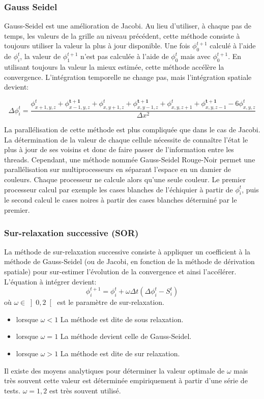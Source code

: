 \subsubsection{Gauss Seidel}
Gauss-Seidel est une amélioration de Jacobi. 
Au lieu d'utiliser, à chaque pas de temps, les valeurs de la grille au niveau précédent, cette méthode consiste à toujours utiliser la valeur la plus à jour disponible. 
Une fois $\phi^{t+1}_0$ calculé à l'aide de $\phi^{t}_i$, la valeur de $\phi^{t+1}_1$ n'est pas calculée à l'aide de $\phi^{t}_0$ mais avec $\phi^{t+1}_0$. 
En utilisant toujours la valeur la mieux estimée, cette méthode accélère la convergence. 
L'intégration temporelle ne change pas, mais l'intégration spatiale devient: 

\[ \Delta \phi_i^t = \dfrac{\phi_{x+1,y,z}^t  + \phi_{x-1,y,z}^\mathbf{t+1} + \phi_{x,y+1,z}^t  + \phi_{x,y-1,z}^\mathbf{t+1} + \phi_{x,y,z+1}^t + \phi_{x,y,z-1}^\mathbf{t+1}	- 6\phi_{x,y,z}^t}{\Delta x ^2} \]

La parallélisation de cette méthode est plus compliquée que dans le cas de Jacobi. 
La détermination de la valeur de chaque cellule nécessite de connaître l'état le plus à jour de ses voisins et donc de faire passer de l'information entre les threads.
Cependant, une méthode nommée Gauss-Seidel Rouge-Noir permet une parallélisation sur multiprocesseurs en séparant l'espace en un damier de couleurs. 
Chaque processeur ne calcule alors qu'une seule couleur. 
Le premier processeur calcul par exemple les cases blanches de l'échiquier à partir de $\phi_i^t$, puis le second calcul le cases noires à partir des cases blanches déterminé par le premier.


\subsubsection{Sur-relaxation successive (SOR)}
La méthode de sur-relaxation successive consiste à appliquer un coefficient à la méthode de Gauss-Seidel (ou de Jacobi, en fonction de la méthode de dérivation spatiale) pour sur-estimer l'évolution de la convergence et ainsi l'accélérer. 
L'équation à intégrer devient:
\[ \phi^{t+1}_i = \phi^{t}_i + \omega  \Delta t \left (\Delta \phi_i^t -S^t_i \right )  \]
où $\omega \in \left] 0,2 \right [$ est le paramètre de sur-relaxation.
\begin{itemize}
\item lorsque $\omega <1$ La méthode est dite de sous relaxation.
\item lorsque $\omega =1$ La méthode devient celle de Gauss-Seidel.
\item lorsque $\omega >1$ La méthode est dite de sur relaxation.
\end{itemize}
Il existe des moyens analytiques pour déterminer la valeur optimale de $\omega$ mais très souvent cette valeur est déterminée empiriquement à partir d'une série de tests. 
$\omega = 1,2$ est très souvent utilisé.

